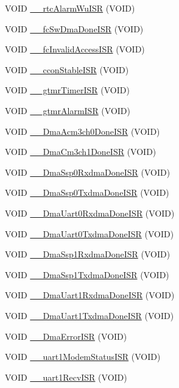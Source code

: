 \begin{DoxyCompactItemize}
\item 
VOID \hyperlink{a00531_a513bd92585a2eada0aeabd77f14ebcaf}{\_\-\_\-rtcAlarmWuISR} (VOID)
\item 
VOID \hyperlink{a00531_a15959788a4f630b57bb384f2e0a925d1}{\_\-\_\-fcSwDmaDoneISR} (VOID)
\item 
VOID \hyperlink{a00531_a31f93b2c800d477360c1bdac9b4c7df2}{\_\-\_\-fcInvalidAccessISR} (VOID)
\item 
VOID \hyperlink{a00531_a9e8e9cfef1abf979c412121340cecc0f}{\_\-\_\-cconStableISR} (VOID)
\item 
VOID \hyperlink{a00531_a558d7b073cbb9a55547ac033563e5a97}{\_\-\_\-gtmrTimerISR} (VOID)
\item 
VOID \hyperlink{a00531_ad7e0da7d2e0186bdf9d5c2b58c44cfc2}{\_\-\_\-gtmrAlarmISR} (VOID)
\item 
VOID \hyperlink{a00531_a4b144d5a051bb2406ac534c82b40e765}{\_\-\_\-DmaAcm3ch0DoneISR} (VOID)
\item 
VOID \hyperlink{a00531_a0cc2f517b65d4e4d202a977824a8aef1}{\_\-\_\-DmaCm3ch1DoneISR} (VOID)
\item 
VOID \hyperlink{a00531_a8c0f0b70ab4ab1e0e626856f9959842c}{\_\-\_\-DmaSsp0RxdmaDoneISR} (VOID)
\item 
VOID \hyperlink{a00531_addc119e27d6674f482baa89f8f7131e4}{\_\-\_\-DmaSsp0TxdmaDoneISR} (VOID)
\item 
VOID \hyperlink{a00531_a7b41e0c42d7fcec26b8ca4309dc15732}{\_\-\_\-DmaUart0RxdmaDoneISR} (VOID)
\item 
VOID \hyperlink{a00531_a5d39b0e12fc0b5c96136e124ab0a036c}{\_\-\_\-DmaUart0TxdmaDoneISR} (VOID)
\item 
VOID \hyperlink{a00531_abdf04702ca7af976f477e0a7c8ee3433}{\_\-\_\-DmaSsp1RxdmaDoneISR} (VOID)
\item 
VOID \hyperlink{a00531_a764fa64e213f699c145272248bfd5192}{\_\-\_\-DmaSsp1TxdmaDoneISR} (VOID)
\item 
VOID \hyperlink{a00531_abe9397adf7c8cdf6473440bee3ab14cf}{\_\-\_\-DmaUart1RxdmaDoneISR} (VOID)
\item 
VOID \hyperlink{a00531_a590f9b8fe3e9c205a307c9cc5339e705}{\_\-\_\-DmaUart1TxdmaDoneISR} (VOID)
\item 
VOID \hyperlink{a00531_ab421c4cbf3ca70021f249866eb9acfc7}{\_\-\_\-DmaErrorISR} (VOID)
\item 
VOID \hyperlink{a00531_a776c02c65a96a0bd882e3dbd63102f6a}{\_\-\_\-uart1ModemStatusISR} (VOID)
\item 
VOID \hyperlink{a00531_aa44da5be262499986ec3ce01225fabbe}{\_\-\_\-uart1RecvISR} (VOID)

\end{DoxyCompactItemize}
